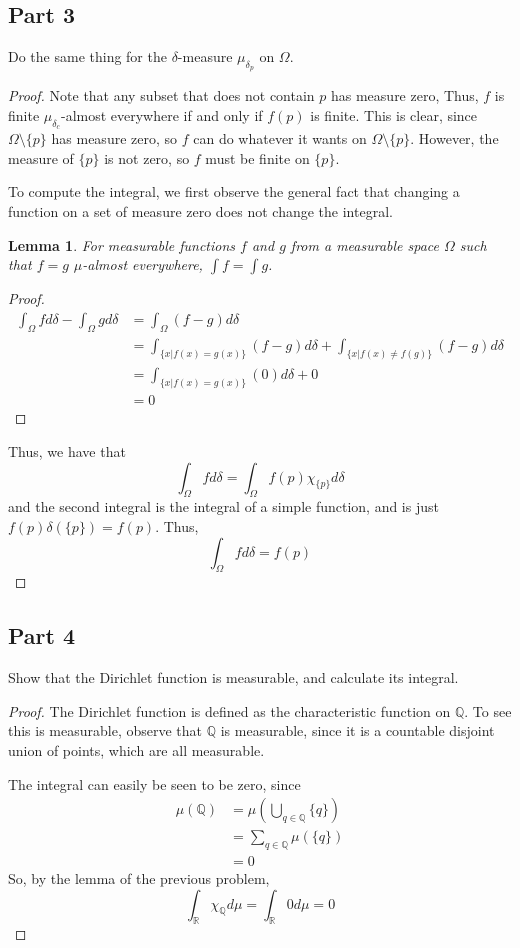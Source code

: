 \documentclass[fontsize=11pt]{scrartcl} %
\numberwithin{equation}{section} %
\numberwithin{figure}{section} %
\numberwithin{table}{section} %
\newcommand{\R}{\mathbb{R}}
\newcommand{\Q}{\mathbb{Q}}
\newtheorem*{lemma}{Lemma}
\begin{document}
\subsection*{Part 3}
Do the same thing for the $\delta$-measure $\mu_{\delta_p}$ on $\Omega$.
\\
\begin{proof}
Note that any subset that does not contain $p$ has measure zero, Thus, $f$ is finite
$\mu_{\delta_c}$-almost everywhere if and only if $f(p)$ is finite. This is clear, since
$\Omega\setminus\{p\}$ has measure zero, so $f$ can do whatever it wants on $\Omega\setminus\{p\}$.
However, the measure of $\{p\}$ is not zero, so $f$ must be finite on $\{p\}$.

To compute the integral, we first observe the general fact that changing a function on
a set of measure zero does not change the integral.
\begin{lemma}
For measurable functions $f$ and $g$ from a measurable space $\Omega$ such that $f=g$ 
$\mu$-almost everywhere, $\int f = \int g$.
\end{lemma}
\begin{proof}
\[
\begin{aligned}
\int_{\Omega}fd\delta -\int_{\Omega}gd\delta  &= \int_{\Omega} (f - g)d\delta\\
                                &= \int_{\{x | f(x) = g(x)\}}(f-g)d\delta + \int_{\{x|f(x)\neq f(g)\}}(f-g)d\delta\\
                                &= \int_{\{x | f(x) = g(x)\}}(0)d\delta + 0\\
                                &= 0
\end{aligned}
\]
\end{proof}
Thus, we have that
\[
\int_{\Omega} fd\delta = \int_{\Omega}f(p)\chi_{\{p\}}d\delta
\]
and the second integral is the integral of a simple function, and is just $f(p)\delta(\{p\}) = f(p)$.
Thus,
\[
\int_{\Omega}fd\delta = f(p)
\]
\end{proof}

\subsection*{Part 4}
Show that the Dirichlet function is measurable, and calculate its integral.
\\
\begin{proof}
The Dirichlet function is defined as the characteristic function on $\Q$. To see this 
is measurable, observe that $\Q$ is measurable, since it is a countable disjoint union of
points, which are all measurable.

The integral can easily be seen to be zero, since
\[
\begin{aligned}
\mu(\Q) &= \mu\left(\bigcup_{q\in\Q} \{q\}\right)\\
        &= \sum_{q\in\Q}\mu(\{q\})\\
        &= 0
\end{aligned}
\]
So, by the lemma of the previous problem,
\[
\int_{\R} \chi_{\Q}d\mu = \int_{\R} 0 d\mu = 0
\]
\end{proof}
\end{document}
